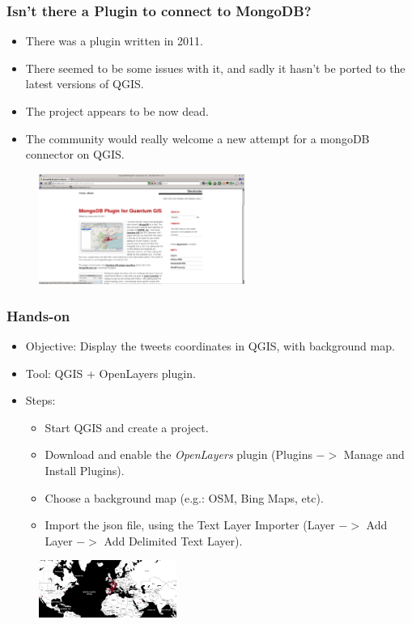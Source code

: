 \documentclass[hyperref={pdfpagelabels=true}]{beamer}
\begin{document}
\begin{frame}
\frametitle{Isn't there a Plugin to connect to MongoDB?}
\begin{itemize}
  \item<1->There was a plugin written in 2011.
  \item<3->There seemed to be some issues with it, and sadly it hasn't be ported to the latest versions of QGIS.
  \item<4->The project appears to be now dead.
  \item<5->The community would really welcome a new attempt for a mongoDB connector on QGIS.  
\end{itemize}      
  \begin{figure}  
      \includegraphics[width=0.6\textwidth]{mongodbplugin.png}\\
    \end{figure}         
\end{frame}

\begin{frame}
\frametitle{Hands-on}
\begin{itemize}
  \item<1->Objective: Display the tweets coordinates in QGIS, with background map.
  \item<1->Tool: QGIS + OpenLayers plugin.
  \item<1->Steps:  
  \begin{itemize}
    \item<2->Start QGIS and create a project.  
    \item<2->Download and enable the \textit{OpenLayers} plugin (Plugins $->$ Manage and Install Plugins).
    \item<2->Choose a background map (e.g.: OSM, Bing Maps, etc).
    \item<2->Import the json file, using the Text Layer Importer (Layer $->$ Add Layer $->$ Add Delimited Text Layer).    
  \end{itemize}    
\end{itemize}  

  \begin{figure}  
      \includegraphics[width=0.4\textwidth]{import.png}\\
    \end{figure}         

\end{frame}
\end{document}
